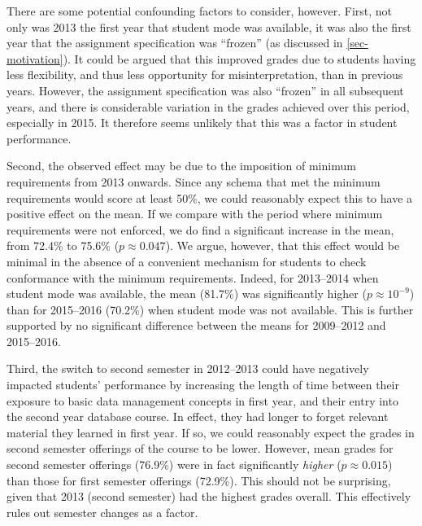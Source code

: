 \documentclass[sigconf, authordraft, capitalise]{acmart}
\begin{document}
There are some potential confounding factors to consider, however. First, not only was 2013 the first year that student mode was available, it was also the first year that the assignment specification was ``frozen'' (as discussed in \cref{sec-motivation}). It could be argued that this improved grades due to students having less flexibility, and thus less opportunity for misinterpretation, than in previous years. However, the assignment specification was also ``frozen'' in all subsequent years, and there is considerable variation in the grades achieved over this period, especially in 2015. It therefore seems unlikely that this was a factor in student performance.

Second, the observed effect may be due to the imposition of minimum requirements from 2013 onwards. Since any schema that met the minimum requirements would score at least 50\%, we could reasonably expect this to have a positive effect on the mean. If we compare with the period where minimum requirements were not enforced, we do find a significant increase in the mean, from 72.4\% to 75.6\% (\(p \approx 0.047\)). We argue, however, that this effect would be minimal in the absence of a convenient mechanism for students to check conformance with the minimum requirements. Indeed, for 2013--2014 when student mode was available, the mean (81.7\%) was significantly higher (\(p \approx 10^{-9}\)) than for 2015--2016 (70.2\%) when student mode was not available. This is further supported by no significant difference between the means for 2009--2012 and 2015--2016.

Third, the switch to second semester in 2012--2013 could have negatively impacted students' performance by increasing the length of time between their exposure to basic data management concepts in first year, and their entry into the second year database course. In effect, they had longer to forget relevant material they learned in first year. If so, we could reasonably expect the grades in second semester offerings of the course to be lower. However, mean grades for second semester offerings (76.9\%) were in fact significantly \emph{higher} (\(p \approx 0.015\)) than those for first semester offerings (72.9\%). This should not be surprising, given that 2013 (second semester) had the highest grades overall. This effectively rules out semester changes as a factor.
\end{document}
